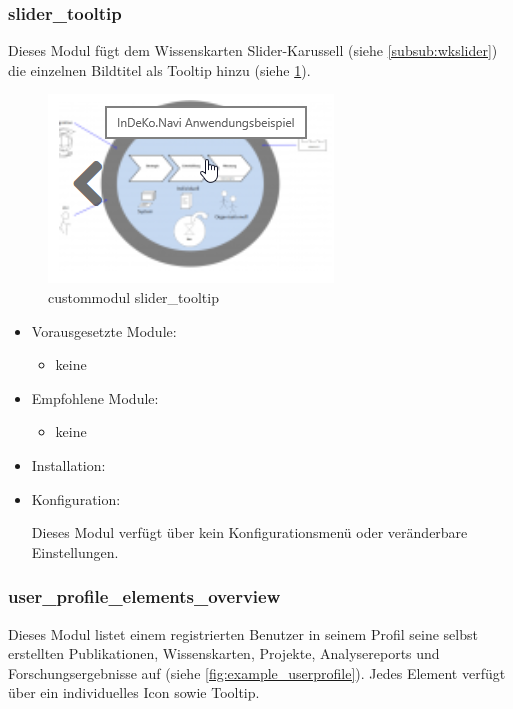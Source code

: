 \newpage
\subsubsection{slider\_tooltip}\label{subsub:slidertooltip}
Dieses Modul fügt dem Wissenskarten Slider-Karussell (siehe \cref{subsub:wkslider}) die einzelnen Bildtitel als Tooltip hinzu (siehe \cref{fig:example_slidertooltip}). 

\begin{figure}[H]
	\centering
	\includegraphics[height=0.10\textheight]{images/example_slidertooltip}
	\caption{\gls{custommodul} slider\_tooltip}
	\label{fig:example_slidertooltip}
\end{figure}

\begin{itemize}[parsep=0pt, itemsep=5.0pt plus 2.0pt minus 1.0pt, leftmargin=*]
	\item Vorausgesetzte Module:
	\begin{itemize}
		\item keine
	\end{itemize}
	
	\item Empfohlene Module:
	\begin{itemize}
		\item keine
	\end{itemize}
	
	\item Installation: \standardinstall
	
	
	\item Konfiguration:
	
	Dieses Modul verfügt über kein Konfigurationsmenü oder veränderbare Einstellungen.	
\end{itemize}


\newpage
\subsubsection{user\_profile\_elements\_overview}\label{subsub:userprofileelementsoverview}
Dieses Modul listet einem registrierten Benutzer in seinem Profil seine selbst erstellten Publikationen, Wissenskarten, Projekte, Analysereports und Forschungsergebnisse auf (siehe \cref{fig:example_userprofile}). Jedes Element verfügt über ein individuelles Icon sowie Tooltip.

